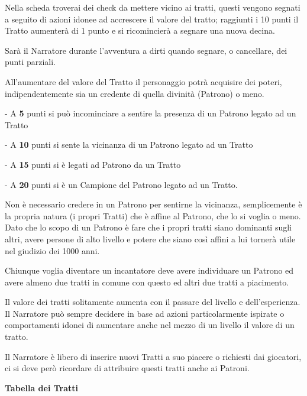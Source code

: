 \documentclass[a4paper,11pt,twoside,openany]{book}
\begin{document}
Nella scheda troverai dei check da mettere vicino ai tratti, questi vengono segnati a seguito di azioni idonee ad accrescere il valore del tratto; raggiunti i 10 punti il Tratto aumenterà di 1 punto e si ricomincierà a segnare una nuova decina.

Sarà il Narratore durante l'avventura a dirti quando segnare, o cancellare, dei punti parziali.

All'aumentare del valore del Tratto il personaggio potrà acquisire dei poteri, indipendentemente sia un credente di quella divinità (Patrono) o meno.

- A \textbf{5} punti si può incominciare a sentire la presenza di un Patrono legato ad un Tratto

- A \textbf{10} punti si sente la vicinanza di un Patrono legato ad un Tratto

- A \textbf{15}  punti si è legati ad Patrono da un Tratto

- A \textbf{20} punti si è un Campione del Patrono legato ad un Tratto.


Non è necessario credere in un Patrono per sentirne la vicinanza, semplicemente è la propria natura (i propri Tratti) che è affine al Patrono, che lo si voglia o meno.
Dato che lo scopo di un Patrono è fare che i propri tratti siano dominanti sugli altri, avere persone di alto livello e potere che siano così affini a lui tornerà utile nel giudizio dei   1000 anni.

Chiunque voglia diventare un incantatore deve avere individuare un Patrono ed avere almeno due tratti in comune con questo ed altri due tratti a piacimento.

\smallskip

Il valore dei tratti solitamente aumenta con il passare del livello e dell'esperienza. Il Narratore può sempre decidere in base ad azioni particolarmente ispirate o comportamenti idonei di aumentare anche nel mezzo di un livello il valore di un tratto.

Il Narratore è libero di inserire nuovi Tratti a suo piacere o richiesti dai giocatori, ci si deve però ricordare di attribuire questi tratti anche ai Patroni.

\bigskip

\pagebreak

\textbf{Tabella dei Tratti}

\bigskip
\end{document}

